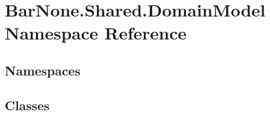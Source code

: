 \hypertarget{namespace_bar_none_1_1_shared_1_1_domain_model}{}\section{Bar\+None.\+Shared.\+Domain\+Model Namespace Reference}
\label{namespace_bar_none_1_1_shared_1_1_domain_model}
\subsection*{Namespaces}
\begin{DoxyCompactItemize}
\end{DoxyCompactItemize}
\subsection*{Classes}
